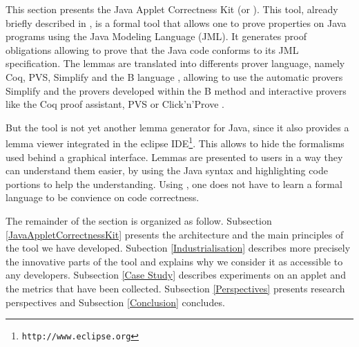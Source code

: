   This section presents the Java Applet Correctness Kit
 (or \JACK).  This tool, already briefly described in
 \cite{BR-gdc2002}, is a formal tool that allows one to prove properties on
 Java programs using the Java Modeling Language \cite{LBR00} (JML).
 It generates proof obligations
 allowing to prove that the Java code conforms to its JML
 specification.  The lemmas are translated into differents prover language, namely Coq, PVS, Simplify and the B language \cite{bbook},
 allowing to use the automatic provers Simplify and the provers developed within the B method and interactive provers like the Coq proof assistant, PVS or Click'n'Prove .

 But the tool is not yet another lemma generator for Java, since it also provides a lemma
 viewer integrated in the eclipse
 IDE\footnote{\texttt{http://www.eclipse.org}}.  This allows to
 hide the formalisms used behind a graphical interface.  Lemmas are
 presented to users in a way they can understand them easier, by using the Java syntax and highlighting code portions to help
 the understanding. Using \JACK, one does not have to learn a formal language to be convience on
code correctness.

 The remainder of the section is organized as follow.  Subsection \ref{JavaAppletCorrectnessKit} presents the
 architecture and the main principles of the tool we have
 developed. Subection \ref{Industrialisation} describes more precisely
 the innovative parts of the tool and explains why we consider it as
 accessible to any developers. Subsection \ref{Case Study} describes
 experiments on an applet and the metrics that have been
 collected.  Subsection \ref{Perspectives} presents research perspectives
 and Subsection \ref{Conclusion} concludes.
